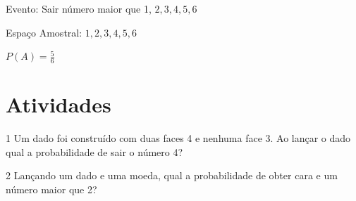 \begin{escolha}
\begin{boxmedio}
\begin{boxmedio}
{\begin{boxpeq}
\begin{boxpeq}
{\begin{boxpeq}
\begin{boxmedio}
\begin{boxmedio}
\begin{boxpeq}
\begin{boxmedio}
\begin{boxpeq}
\begin{boxpeq}
\begin{boxpeq}
\begin{boxpeq}
\begin{boxmedio}
{\begin{boxmedio}
\begin{boxmedio}
\begin{boxpeq}
\begin{boxmedio}
\begin{boxpeq}
\begin{boxpeq}
\begin{boxpeq}
\begin{escolha}
{\begin{boxmedio}
\begin{boxpeq}
\begin{boxpeq}
\begin{boxpeq}
\begin{boxpeq}
\begin{boxpeq}
\begin{boxmedio}
\begin{boxpeq}
\begin{boxpeq}
\begin{boxpeq}
{\begin{boxpeq}
\begin{boxmedio}
\begin{boxpeq}
\begin{boxpeq}
\begin{boxpeq}
{\begin{boxpeq}
\begin{boxmedio}
{\begin{boxpeq}
\begin{boxpeq}
\begin{boxmedio}
\begin{boxmedio}
\begin{boxpeq}
\begin{boxpeq}
{\begin{boxpeq}
\begin{boxpeq}
\begin{boxpeq}
\begin{boxpeq}
\begin{boxpeq}
\begin{escolha}
\begin{escolha}
{\begin{boxmedio}
\begin{boxpeq}
\begin{q°}
\begin{boxmedio}
\begin{boxpeq}
\begin{boxpeq}
\begin{boxmedio}
\begin{boxmedio}
\begin{boxmedio}
\begin{boxmedio}
{\begin{enumerate}
\begin{boxpeq}
{\begin{boxpeq}
\begin{boxpeq}
\begin{boxmedio}
\begin{boxpeq}
\begin{boxpeq}
\begin{boxpeq}
{\begin{boxpeq}
\begin{boxmedio}
\begin{boxpeq}
{Evento: Sair número maior que 1, ${2, 3, 4, 5, 6}$

Espaço Amostral: ${1, 2, 3, 4, 5, 6}$

$P(A) = \frac{5}{6}$
}

\section{Atividades}

\num{1} Um dado foi construído com duas faces 4 e nenhuma face 3. Ao lançar o
dado qual a probabilidade de sair o número 4?

\begin{boxpeq}

\num{2} Lançando um dado e uma moeda, qual a probabilidade de obter cara e um
número maior que 2?


\end{boxpeq}
\end{boxpeq}
\end{boxmedio}
\end{boxpeq}}
\end{boxpeq}
\end{boxpeq}
\end{boxpeq}
\end{boxmedio}
\end{boxpeq}
\end{boxpeq}}
\end{boxpeq}
\end{enumerate}}
\end{boxmedio}
\end{boxmedio}
\end{boxmedio}
\end{boxmedio}
\end{boxpeq}
\end{boxpeq}
\end{boxmedio}
\end{q°}
\end{boxpeq}
\end{boxmedio}}
\end{escolha}
\end{escolha}
\end{boxpeq}
\end{boxpeq}
\end{boxpeq}
\end{boxpeq}
\end{boxpeq}}
\end{boxpeq}
\end{boxpeq}
\end{boxmedio}
\end{boxmedio}
\end{boxpeq}
\end{boxpeq}}
\end{boxmedio}
\end{boxpeq}}
\end{boxpeq}
\end{boxpeq}
\end{boxpeq}
\end{boxmedio}
\end{boxpeq}}
\end{boxpeq}
\end{boxpeq}
\end{boxpeq}
\end{boxmedio}
\end{boxpeq}
\end{boxpeq}
\end{boxpeq}
\end{boxpeq}
\end{boxpeq}
\end{boxmedio}}
\end{escolha}
\end{boxpeq}
\end{boxpeq}
\end{boxpeq}
\end{boxmedio}
\end{boxpeq}
\end{boxmedio}
\end{boxmedio}}
\end{boxmedio}
\end{boxpeq}
\end{boxpeq}
\end{boxpeq}
\end{boxpeq}
\end{boxmedio}
\end{boxpeq}
\end{boxmedio}
\end{boxmedio}
\end{boxpeq}}
\end{boxpeq}
\end{boxpeq}}
\end{boxmedio}
\end{boxmedio}
\end{escolha}

